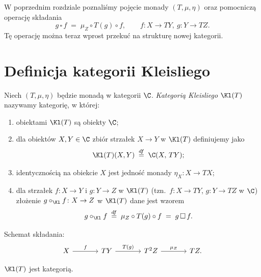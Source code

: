 W poprzednim rozdziale poznaliśmy pojęcie monady $(T,\mu,\eta)$ oraz pomocniczą operację składania
\[
g\,\square\,f \;=\; \mu_Z\circ T(g)\circ f, \qquad f\colon X\to TY,\ g\colon Y\to TZ.
\]
Tę operację można teraz wprost przekuć na strukturę nowej kategorii.

\section{Definicja kategorii Kleisliego}

\begin{definicja}
Niech $(T,\mu,\eta)$ będzie monadą w kategorii $\C$. \emph{Kategorią Kleisliego} $\Kl(T)$ nazywamy kategorię, w której:
\begin{enumerate}
\item obiektami $\Kl(T)$ są obiekty $\C$;
\item dla obiektów $X,Y\in\C$ zbiór strzałek $X\to Y$ w $\Kl(T)$ definiujemy jako
\[
\Kl(T)(X,Y) \;\stackrel{df}{=}\; \C(X,\,T Y);
\]
\item identycznością na obiekcie $X$ jest jedność monady $\eta_X\colon X\to TX$;
\item dla strzałek $f\colon X\to Y$ i $g\colon Y\to Z$ w $\Kl(T)$ (tzn.\ $f\colon X\to TY$, $g\colon Y\to TZ$ w $\C$) złożenie $g\circ_{\Kl} f\colon X\to Z$ w $\Kl(T)$ dane jest wzorem
\[
g\circ_{\Kl} f \;\stackrel{df}{=}\; \mu_Z \circ T(g) \circ f \;=\; g\,\square\,f.
\]
\end{enumerate}
\end{definicja}

Schemat składania:
\[
\begin{tikzcd}[column sep=large]
X \arrow[r,"f"] & TY \arrow[r,"T(g)"] & T^2 Z \arrow[r,"\mu_Z"] & TZ.
\end{tikzcd}
\]

\begin{stwierdzenie}
$\Kl(T)$ jest kategorią.
\end{stwierdzenie}

